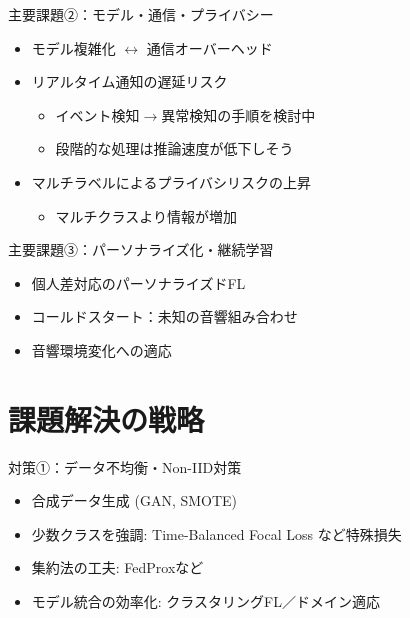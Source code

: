 \documentclass[unicode,12pt,aspectratio=169,dvipdfmx]{beamer}
\begin{document}
\begin{frame}{主要課題②：モデル・通信・プライバシー}
  \begin{itemize}
    \item モデル複雑化 \(\leftrightarrow\)  通信オーバーヘッド
    \item リアルタイム通知の遅延リスク
    \begin{itemize}
        \item イベント検知\(\rightarrow\)異常検知の手順を検討中
        \item 段階的な処理は推論速度が低下しそう
    \end{itemize}
    \item マルチラベルによるプライバシリスクの上昇
    \begin{itemize}
        \item マルチクラスより情報が増加
    \end{itemize}
\end{itemize}
\end{frame}
\begin{frame}{主要課題③：パーソナライズ化・継続学習}
  \begin{itemize}
    \item 個人差対応のパーソナライズドFL
    \item コールドスタート：未知の音響組み合わせ
    \item 音響環境変化への適応
  \end{itemize}
\end{frame}
\section{課題解決の戦略}


\begin{frame}{対策①：データ不均衡・Non-IID対策}
  \begin{itemize}
    \item 合成データ生成 (GAN, SMOTE)
    \item 少数クラスを強調: Time-Balanced Focal Loss\cite{TBFL} など特殊損失
    \item 集約法の工夫: FedProx\cite{FedProx}など
    \item モデル統合の効率化: クラスタリングFL／ドメイン適応
  \end{itemize}
\end{frame}
\end{document}

